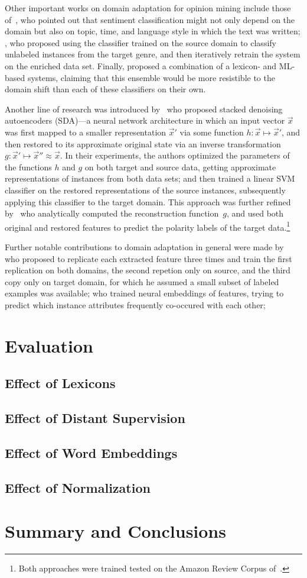 Other important works on domain adaptation for opinion mining include
those of~\citet{Read:05}, who pointed out that sentiment
classification might not only depend on the domain but also on topic,
time, and language style in which the text was written;
\citet{Tan:07}, who proposed using the classifier trained on the
source domain to classify unlabeled instances from the target genre,
and then iteratively retrain the system on the enriched data set.
Finally, \citet{Andreevskaia:08} proposed a combination of a lexicon-
and ML-based systems, claiming that this ensemble would be more
resistible to the domain shift than each of these classifiers on their
own.

Another line of research was introduced by~\citet{Glorot:11} who
proposed stacked denoising autoencoders (SDA)---a neural network
architecture in which an input vector $\vec{x}$ was first mapped to a
smaller representation $\vec{x}'$ via some function
$h: \vec{x}\mapsto\vec{x}'$, and then restored to its approximate
original state via an inverse transformation
$g: \vec{x}'\mapsto\vec{x}''\approx\vec{x}$.  In their experiments,
the authors optimized the parameters of the functions $h$ and $g$ on
both target and source data, getting approximate representations of
instances from both data sets; and then trained a linear SVM
classifier on the restored representations of the source instances,
subsequently applying this classifier to the target domain.  This
approach was further refined by~\citet{Chen:12} who analytically
computed the reconstruction function~$g$, and used both original and
restored features to predict the polarity labels of the target
data.\footnote{Both approaches were trained tested on the Amazon
  Review Corpus of~\citet{Blitzer:07}.}


Further notable contributions to domain adaptation in general were
made by~\citet{Daume:07} who proposed to replicate each extracted
feature three times and train the first replication on both domains,
the second repetion only on source, and the third copy only on target
domain, for which he assumed a small subset of labeled examples was
available; \citet{Yang:15} who trained neural embeddings of features,
trying to predict which instance attributes frequently co-occured with
each other;

\section{Evaluation}
\subsection{Effect of Lexicons}
\subsection{Effect of Distant Supervision}
\subsection{Effect of Word Embeddings}
\subsection{Effect of Normalization}

\section{Summary and Conclusions}\label{slsa:subsec:conclusions}
